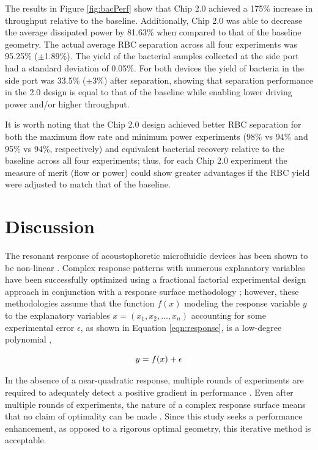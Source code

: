 The results in Figure \ref{fig:bacPerf} show that Chip 2.0 achieved a 175\% increase in throughput relative to the baseline. Additionally, Chip 2.0 was able to decrease the average dissipated power by 81.63\% when compared to that of the baseline geometry. The actual average RBC separation across all four experiments was 95.25\% ($\pm$1.89\%). The yield of the bacterial samples collected at the side port had a standard deviation of 0.05\%.  For both devices the yield of bacteria in the side port was 33.5\% ($\pm$3\%) after separation, showing that separation performance in the 2.0 design is equal to that of the baseline while enabling lower driving power and/or higher throughput.

It is worth noting that the Chip 2.0 design achieved better RBC separation  for both the maximum flow rate and minimum power experiments (98\% vs 94\% and 95\% vs 94\%, respectively) and equivalent bacterial recovery relative to the baseline across all four experiments; thus, for each Chip 2.0 experiment the measure of merit (flow or power) could show greater advantages if the RBC yield were adjusted to match that of the baseline. 


\section{Discussion}
\label{sec:discussion}

The resonant response of acoustophoretic microfluidic devices has been shown to be non-linear \cite{garofalo2016performance}\cite{bora2015efficient}\cite{glynne2009new}\cite{hahn2014modeling}. Complex response patterns with numerous explanatory variables have been successfully optimized using a fractional factorial experimental design approach in conjunction with a response surface methodology \cite{khuri2010response}; however, these methodologies assume that the function $f(x)$ modeling the response variable $y$ to the explanatory variables $x=(x_1,x_2,\dots,x_n)$ accounting for some experimental error $\epsilon$, as shown in Equation \ref{eqn:response}, is a low-degree polynomial \cite{khuri2010response}, 

\begin{equation}
\label{eqn:response}
  \hfill y=f(x)+\epsilon \hfill
\end{equation}

In the absence of a near-quadratic response, multiple rounds of experiments are required to adequately detect a positive gradient in performance \cite{carley2004response}. Even after multiple rounds of experiments, the nature of a complex response surface means that no claim of optimality can be made \cite{box2006improving}. Since this study seeks a performance enhancement, as opposed to a rigorous optimal geometry, this iterative method is acceptable.   

